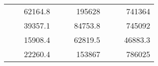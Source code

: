 \begin{table}[H]
\begin{tabular}{|ccrccrccc}
\rowcolor[HTML]{DDFDFF} 
\multicolumn{1}{|c|}{\cellcolor[HTML]{FFFFC7}}                                & \multicolumn{1}{c|}{\cellcolor[HTML]{DDFDFF}}                      & \multicolumn{1}{r|}{\cellcolor[HTML]{DAE8FC}62164.8}   & \multicolumn{1}{c|}{\cellcolor[HTML]{FFFFC7}}                                & \multicolumn{1}{c|}{\cellcolor[HTML]{DDFDFF}}                       & \multicolumn{1}{r|}{\cellcolor[HTML]{DDFDFF}195628}    & \multicolumn{1}{c|}{\cellcolor[HTML]{FFFFC7}}                                & \multicolumn{1}{c|}{\cellcolor[HTML]{DDFDFF}}                      & \multicolumn{1}{r|}{\cellcolor[HTML]{DDFDFF}741364}    \\ \cline{3-3} \cline{6-6} \cline{9-9} 
\multicolumn{1}{|c|}{\cellcolor[HTML]{FFFFC7}}                                & \multicolumn{1}{c|}{\cellcolor[HTML]{DDFDFF}}                      & \multicolumn{1}{r|}{\cellcolor[HTML]{DDFDFF}39357.1}   & \multicolumn{1}{c|}{\cellcolor[HTML]{FFFFC7}}                                & \multicolumn{1}{c|}{\cellcolor[HTML]{DDFDFF}}                       & \multicolumn{1}{r|}{\cellcolor[HTML]{DAE8FC}84753.8}   & \multicolumn{1}{c|}{\cellcolor[HTML]{FFFFC7}}                                & \multicolumn{1}{c|}{\cellcolor[HTML]{DDFDFF}}                      & \multicolumn{1}{r|}{\cellcolor[HTML]{DAE8FC}745092}    \\ \cline{3-3} \cline{6-6} \cline{9-9} 
\rowcolor[HTML]{DDFDFF} 
\multicolumn{1}{|c|}{\cellcolor[HTML]{FFFFC7}}                                & \multicolumn{1}{c|}{\cellcolor[HTML]{DDFDFF}}                      & \multicolumn{1}{r|}{\cellcolor[HTML]{DAE8FC}15908.4}   & \multicolumn{1}{c|}{\cellcolor[HTML]{FFFFC7}}                                & \multicolumn{1}{c|}{\cellcolor[HTML]{DDFDFF}}                       & \multicolumn{1}{r|}{\cellcolor[HTML]{DDFDFF}62819.5}   & \multicolumn{1}{c|}{\cellcolor[HTML]{FFFFC7}}                                & \multicolumn{1}{c|}{\cellcolor[HTML]{DDFDFF}}                      & \multicolumn{1}{r|}{\cellcolor[HTML]{DDFDFF}46883.3}   \\ \cline{3-3} \cline{6-6} \cline{9-9} 
\multicolumn{1}{|c|}{\cellcolor[HTML]{FFFFC7}}                                & \multicolumn{1}{c|}{\cellcolor[HTML]{DDFDFF}}                      & \multicolumn{1}{r|}{\cellcolor[HTML]{DDFDFF}22260.4}   & \multicolumn{1}{c|}{\cellcolor[HTML]{FFFFC7}}                                & \multicolumn{1}{c|}{\cellcolor[HTML]{DDFDFF}}                       & \multicolumn{1}{r|}{\cellcolor[HTML]{DAE8FC}153867}    & \multicolumn{1}{c|}{\cellcolor[HTML]{FFFFC7}}                                & \multicolumn{1}{c|}{\cellcolor[HTML]{DDFDFF}}                      & \multicolumn{1}{r|}{\cellcolor[HTML]{DAE8FC}786025}    \\ \cline{3-3} \cline{6-6} \cline{9-9} 

\end{tabular}
\end{table}
